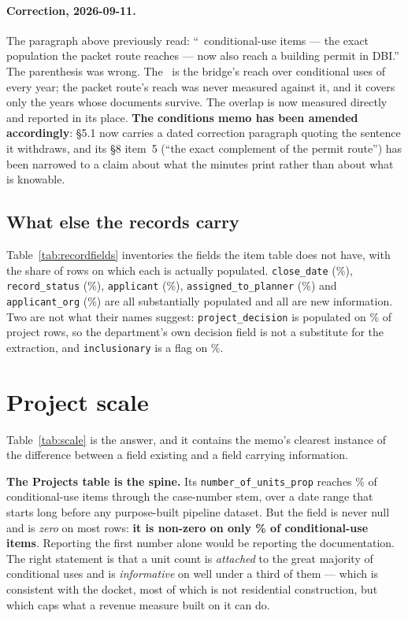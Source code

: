 \documentclass[11pt]{article}
\begin{document}
\paragraph{Correction, 2026-09-11.} The paragraph above previously read: ``\acqBridgeCUN\
conditional-use items --- the exact population the packet route reaches --- now also reach a
building permit in DBI.'' The parenthesis was wrong. The \acqBridgeCUN\ is the bridge's reach
over conditional uses of every year; the packet route's reach was never measured against it,
and it covers only the years whose documents survive. The overlap is now measured directly
and reported in its place. \textbf{The conditions memo has been amended
accordingly}: \S5.1 now carries a dated correction paragraph quoting the sentence it
withdraws, and its \S8 item~5 (``the exact complement of the permit route'') has been
narrowed to a claim about what the minutes print rather than about what is knowable.

\subsection{What else the records carry}

Table~\ref{tab:recordfields} inventories the fields the item table does not have, with the
share of rows on which each is actually populated. \texttt{close\_date} (\acqNpCloseDate\%),
\texttt{record\_status} (\acqNpRecordStatus\%), \texttt{applicant} (\acqNpApplicant\%),
\texttt{assigned\_to\_planner} (\acqNpPlanner\%) and \texttt{applicant\_org}
(\acqNpApplicantOrg\%) are all substantially populated and all are new information. Two are
not what their names suggest: \texttt{project\_decision} is populated on \acqPrDecision\% of
project rows, so the department's own decision field is not a substitute for the extraction,
and \texttt{inclusionary} is a flag on \acqPrInclFlag\%.

\section{Project scale}
\label{sec:scale}

Table~\ref{tab:scale} is the answer, and it contains the memo's clearest instance of the
difference between a field existing and a field carrying information.

\textbf{The Projects table is the spine.} Its \texttt{number\_of\_units\_prop} reaches
\acqCuUnits\% of conditional-use items through the case-number stem, over a date range that
starts long before any purpose-built pipeline dataset. But the field is never null and is
\emph{zero} on most rows: \textbf{it is non-zero on only \acqCuUnitsNZ\% of conditional-use
items}. Reporting the first number alone would be reporting the documentation. The right
statement is that a unit count is \emph{attached} to the great majority of conditional uses
and is \emph{informative} on well under a third of them --- which is consistent with the
docket, most of which is not residential construction, but which caps what a revenue measure
built on it can do.
\end{document}
